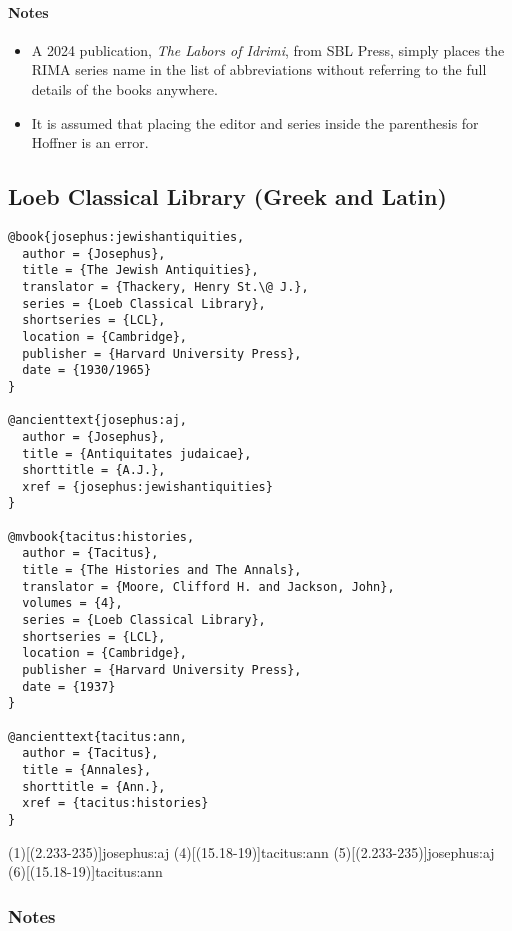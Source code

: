 \documentclass[a4paper]{article}
\begin{document}
\paragraph{Notes}

\begin{itemize}
  \item A 2024 publication, \emph{The Labors of Idrimi}, from SBL Press,
    simply places the RIMA series name in the list of abbreviations without
    referring to the full details of the books anywhere.
  \item It is assumed that placing the editor and series inside the
    parenthesis for Hoffner is an error.
\end{itemize}

\subsection{Loeb Classical Library (Greek and Latin)}

\begin{verbatim}
@book{josephus:jewishantiquities,
  author = {Josephus},
  title = {The Jewish Antiquities},
  translator = {Thackery, Henry St.\@ J.},
  series = {Loeb Classical Library},
  shortseries = {LCL},
  location = {Cambridge},
  publisher = {Harvard University Press},
  date = {1930/1965}
}

@ancienttext{josephus:aj,
  author = {Josephus},
  title = {Antiquitates judaicae},
  shorttitle = {A.J.},
  xref = {josephus:jewishantiquities}
}

@mvbook{tacitus:histories,
  author = {Tacitus},
  title = {The Histories and The Annals},
  translator = {Moore, Clifford H. and Jackson, John},
  volumes = {4},
  series = {Loeb Classical Library},
  shortseries = {LCL},
  location = {Cambridge},
  publisher = {Harvard University Press},
  date = {1937}
}

@ancienttext{tacitus:ann,
  author = {Tacitus},
  title = {Annales},
  shorttitle = {Ann.},
  xref = {tacitus:histories}
}
\end{verbatim}

\examplecite(1)[(2.233-235)]{josephus:aj}
\examplecite(4)[(15.18-19)]{tacitus:ann}
\examplecite[atrans](5)[(2.233-235)]{josephus:aj}
\examplecite[atrans](6)[(15.18-19)]{tacitus:ann}
\exampleabbreviations
\examplebibliography

\subsubsection{Notes}
\end{document}
